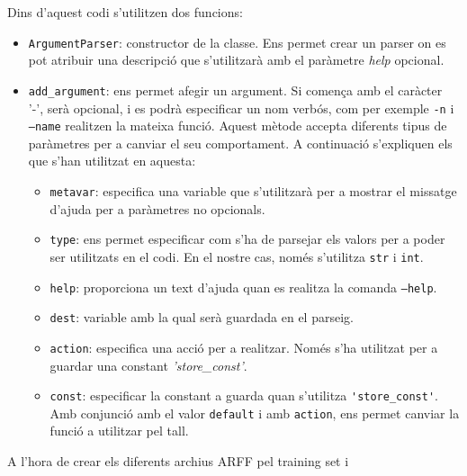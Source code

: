  Dins d'aquest codi s'utilitzen dos funcions:
 \begin{itemize}
 	\item \texttt{ArgumentParser}: constructor de la classe. Ens permet crear un parser on es 
 	pot atribuir una descripció que s'utilitzarà amb el paràmetre \textit{help} opcional.
 	
 	\item \verb|add_argument|: ens permet afegir un argument. Si comença amb el caràcter
 	'-', serà opcional, i es podrà especificar un nom verbós, com per exemple \texttt{-n} i
 	\texttt{--name} realitzen la mateixa funció. Aquest mètode accepta diferents tipus de 
 	paràmetres per a canviar el seu comportament. A continuació s'expliquen els que s'han utilitzat
 	en aquesta:
 		\begin{itemize}
 			\item \texttt{metavar}: especifica una variable que s'utilitzarà per a mostrar el missatge
 			d'ajuda per a paràmetres no opcionals.
 			
 			\item \texttt{type}: ens permet especificar com s'ha de parsejar els valors per a poder
 			ser utilitzats en el codi. En el nostre cas, només s'utilitza \texttt{str} i \texttt{int}.
 			
 			\item \texttt{help}: proporciona un text d'ajuda quan es realitza la comanda \texttt{--help}.
 			
 			\item \texttt{dest}: variable amb la qual serà guardada en el parseig.
 			
 			\item \texttt{action}: especifica una acció per a realitzar. Només s'ha utilitzat per a 
 			guardar una constant \textit{'store\_const'}.
 		
 			\item \texttt{const}: especificar la constant a guarda quan s'utilitza \verb|'store_const'|.
 			Amb conjunció amb el valor \texttt{default} i amb \texttt{action}, ens permet canviar 
 			la funció a utilitzar pel tall.
 		\end{itemize}
 \end{itemize}
A l'hora de crear els diferents archius ARFF pel training set i 



